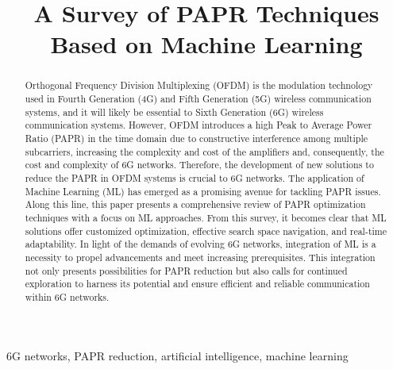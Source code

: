 \documentclass[conference]{IEEEtran}
\begin{document}
\title{A Survey of PAPR Techniques Based on Machine Learning}

\author{
}

\maketitle

\begin{abstract}
Orthogonal Frequency Division Multiplexing (OFDM) is the modulation technology used in Fourth Generation (4G) and Fifth Generation (5G) wireless communication systems, and it will likely be essential to Sixth Generation (6G) wireless communication systems. However, OFDM introduces a high Peak to Average Power Ratio (PAPR) in the time domain due to constructive interference among multiple subcarriers, increasing the complexity and cost of the amplifiers and, consequently, the cost and complexity of 6G networks. Therefore, the development of new solutions to reduce the PAPR in OFDM systems is crucial to 6G networks. The application of Machine Learning (ML) has emerged as a promising avenue for tackling PAPR issues. Along this line, this paper presents a comprehensive review of PAPR optimization techniques with a focus on ML approaches. From this survey, it becomes clear that ML solutions offer customized optimization, effective search space navigation, and real-time adaptability. In light of the demands of evolving 6G networks, integration of ML is a necessity to propel advancements and meet increasing prerequisites. This integration not only presents possibilities for PAPR reduction but also calls for continued exploration to harness its potential and ensure efficient and reliable communication within 6G networks.
\end{abstract}

\begin{IEEEkeywords}
6G networks, PAPR reduction, artificial intelligence, machine learning
\end{IEEEkeywords}
\end{document}
